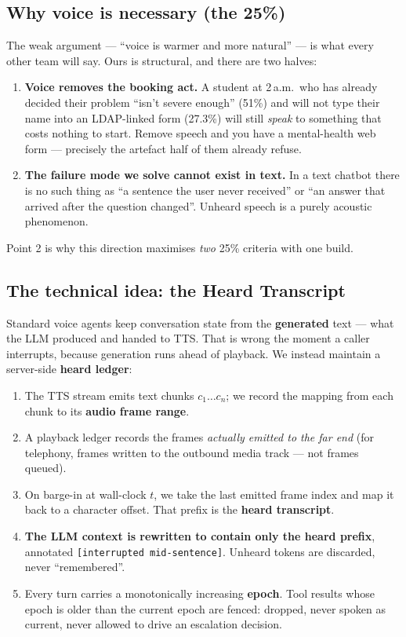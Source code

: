 \documentclass[11pt,a4paper]{article}
\newcommand{\code}[1]{\texttt{\small #1}}
\begin{document}
\subsection{Why voice is necessary (the 25\%)}

The weak argument --- ``voice is warmer and more natural'' --- is what every other team
will say. Ours is structural, and there are two halves:

\begin{enumerate}
\item \textbf{Voice removes the booking act.} A student at 2\,a.m.\ who has already decided
their problem ``isn't severe enough'' (51\%) and will not type their name into an
LDAP-linked form (27.3\%) will still \emph{speak} to something that costs nothing to start.
Remove speech and you have a mental-health web form --- precisely the artefact half of them
already refuse.
\item \textbf{The failure mode we solve cannot exist in text.} In a text chatbot there is
no such thing as ``a sentence the user never received'' or ``an answer that arrived after
the question changed''. Unheard speech is a purely acoustic phenomenon.
\end{enumerate}

Point 2 is why this direction maximises \emph{two} 25\% criteria with one build.

\subsection{The technical idea: the Heard Transcript}

Standard voice agents keep conversation state from the \textbf{generated} text --- what the
LLM produced and handed to TTS. That is wrong the moment a caller interrupts, because
generation runs ahead of playback. We instead maintain a server-side
\textbf{heard ledger}:

\begin{enumerate}
\item The TTS stream emits text chunks $c_1 \dots c_n$; we record the mapping from each
chunk to its \textbf{audio frame range}.
\item A playback ledger records the frames \emph{actually emitted to the far end}
(for telephony, frames written to the outbound media track --- not frames queued).
\item On barge-in at wall-clock $t$, we take the last emitted frame index and map it back
to a character offset. That prefix is the \textbf{heard transcript}.
\item \textbf{The LLM context is rewritten to contain only the heard prefix}, annotated
\code{[interrupted mid-sentence]}. Unheard tokens are discarded, never ``remembered''.
\item Every turn carries a monotonically increasing \textbf{epoch}. Tool results whose
epoch is older than the current epoch are fenced: dropped, never spoken as current,
never allowed to drive an escalation decision.
\end{enumerate}
\end{document}
